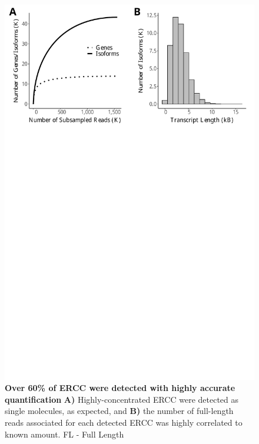 \begin{figure}[htp]
	\begin{center}
		\includegraphics[page=3,trim={0 25cm 0 0},clip,scale = 0.55]{Figures/IsoSeqWholeTranscriptome.pdf}
	\end{center}
	\captionsetup{width=0.95\textwidth}
	\caption[Detection of ERCC standards in Whole Transcriptome Iso-Seq]%
	{\textbf{Over 60\% of ERCC were detected with highly accurate quantification} \textbf{A)} Highly-concentrated ERCC were detected as single molecules, as expected, and \textbf{B)} the number of full-length reads associated for each detected ERCC was highly correlated to known amount. FL - Full Length}
	\label{fig:isoseq_whole_ercc}
\end{figure}


